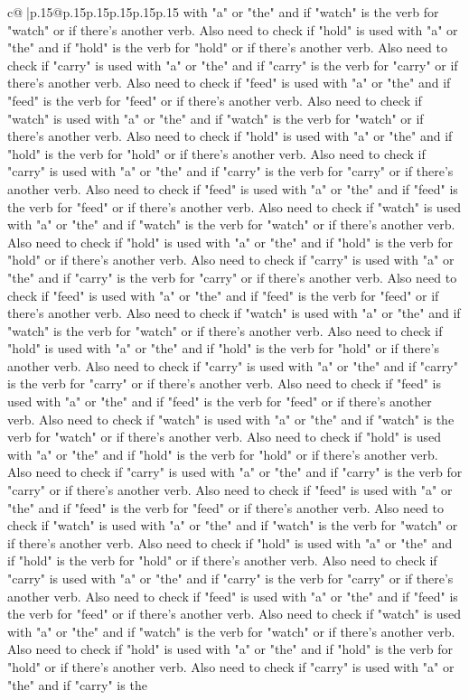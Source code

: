 \documentclass{article}
\begin{document}
{\begin{supertabular}{c@{$\;$}|p{.15\linewidth}@{}p{.15\linewidth}p{.15\linewidth}p{.15\linewidth}p{.15\linewidth}p{.15\linewidth}}
{{{with "a" or "the" and if "watch" is the verb for "watch" or if there's another verb. Also need to check if "hold" is used with "a" or "the" and if "hold" is the verb for "hold" or if there's another verb. Also need to check if "carry" is used with "a" or "the" and if "carry" is the verb for "carry" or if there's another verb. Also need to check if "feed" is used with "a" or "the" and if "feed" is the verb for "feed" or if there's another verb. Also need to check if "watch" is used with "a" or "the" and if "watch" is the verb for "watch" or if there's another verb. Also need to check if "hold" is used with "a" or "the" and if "hold" is the verb for "hold" or if there's another verb. Also need to check if "carry" is used with "a" or "the" and if "carry" is the verb for "carry" or if there's another verb. Also need to check if "feed" is used with "a" or "the" and if "feed" is the verb for "feed" or if there's another verb. Also need to check if "watch" is used with "a" or "the" and if "watch" is the verb for "watch" or if there's another verb. Also need to check if "hold" is used with "a" or "the" and if "hold" is the verb for "hold" or if there's another verb. Also need to check if "carry" is used with "a" or "the" and if "carry" is the verb for "carry" or if there's another verb. Also need to check if "feed" is used with "a" or "the" and if "feed" is the verb for "feed" or if there's another verb. Also need to check if "watch" is used with "a" or "the" and if "watch" is the verb for "watch" or if there's another verb. Also need to check if "hold" is used with "a" or "the" and if "hold" is the verb for "hold" or if there's another verb. Also need to check if "carry" is used with "a" or "the" and if "carry" is the verb for "carry" or if there's another verb. Also need to check if "feed" is used with "a" or "the" and if "feed" is the verb for "feed" or if there's another verb. Also need to check if "watch" is used with "a" or "the" and if "watch" is the verb for "watch" or if there's another verb. Also need to check if "hold" is used with "a" or "the" and if "hold" is the verb for "hold" or if there's another verb. Also need to check if "carry" is used with "a" or "the" and if "carry" is the verb for "carry" or if there's another verb. Also need to check if "feed" is used with "a" or "the" and if "feed" is the verb for "feed" or if there's another verb. Also need to check if "watch" is used with "a" or "the" and if "watch" is the verb for "watch" or if there's another verb. Also need to check if "hold" is used with "a" or "the" and if "hold" is the verb for "hold" or if there's another verb. Also need to check if "carry" is used with "a" or "the" and if "carry" is the verb for "carry" or if there's another verb. Also need to check if "feed" is used with "a" or "the" and if "feed" is the verb for "feed" or if there's another verb. Also need to check if "watch" is used with "a" or "the" and if "watch" is the verb for "watch" or if there's another verb. Also need to check if "hold" is used with "a" or "the" and if "hold" is the verb for "hold" or if there's another verb. Also need to check if "carry" is used with "a" or "the" and if "carry" is the }}}
\end{supertabular}}
\end{document}
